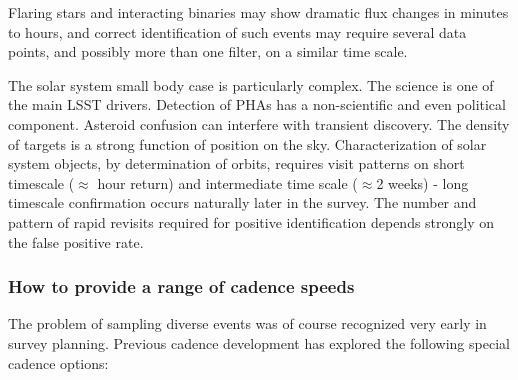 Flaring stars and interacting binaries may show dramatic flux changes
in minutes to hours, and correct identification of such events may
require several data points, and possibly more than one filter, on a
similar time scale.

The solar system small body case is particularly complex.  The science
is one of the main LSST drivers.  Detection of PHAs has a non-scientific
and even political component. Asteroid confusion can interfere with
transient discovery. The density of targets is a strong function of
position on the sky.  Characterization of solar system objects, by
determination of orbits, requires visit patterns on short timescale
($\approx$ hour return) and intermediate time scale ($\approx$2 weeks) -
long timescale confirmation occurs naturally later in the survey.  The
number and pattern of rapid revisits required for positive
identification depends strongly on the false positive rate.


\subsubsection{How to provide a range of cadence speeds}

The problem of sampling diverse events was of course recognized very
early in survey planning. Previous cadence development has explored the
following special cadence options:

